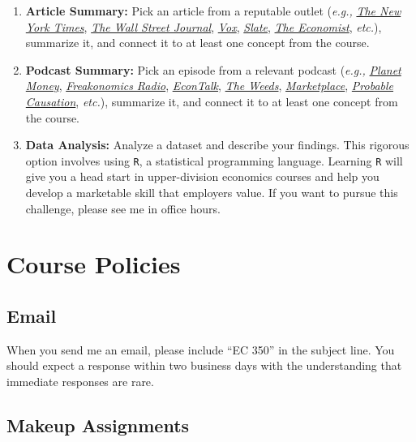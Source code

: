 \documentclass[11pt]{article}
\begin{document}
\begin{enumerate}
	\setlength{\itemsep}{0pt}
	\item \textbf{Article Summary:} Pick an article from a reputable outlet (\textit{e.g.,} \href{https://www.nytimes.com/}{\textit{The New York Times}}, \href{https://www.wsj.com/}{\textit{The Wall Street Journal}}, \href{https://www.vox.com/}{\textit{Vox}}, \href{https://slate.com/}{\textit{Slate}}, \href{https://www.economist.com/}{\textit{The Economist}}, \textit{etc.}), summarize it, and connect it to at least one concept from the course.
	\item \textbf{Podcast Summary:} Pick an episode from a relevant podcast (\textit{e.g.,} \href{https://www.npr.org/sections/money/}{\textit{Planet Money}}, \href{https://www.npr.org/podcasts/452538045/freakonomics-radio}{\textit{Freakonomics Radio}}, \href{https://www.econtalk.org/}{\textit{EconTalk}}, \href{https://www.vox.com/the-weeds}{\textit{The Weeds}}, \href{https://www.npr.org/podcasts/381444600/marketplace}{\textit{Marketplace}}, \href{https://www.probablecausation.com/}{\textit{Probable Causation}}, \textit{etc.}), summarize it, and connect it to at least one concept from the course.
	\item \textbf{Data Analysis:} Analyze a dataset and describe your findings. This rigorous option involves using \texttt{R}, a statistical programming language. Learning \texttt{R} will give you a head start in upper-division economics courses and help you develop a marketable skill that employers value. If you want to pursue this challenge, please see me in office hours.
\end{enumerate}



\newpage

\section*{Course Policies}

\subsection*{Email} 

When you send me an email, please include ``EC 350'' in the subject line. You should expect a response within two business days with the understanding that immediate responses are rare. 

\subsection*{Makeup Assignments} 
\end{document}
